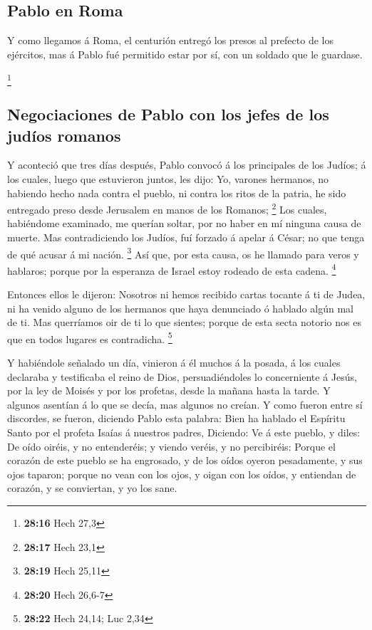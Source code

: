 \hypertarget{pablo-en-roma}{%
\subsection{Pablo en Roma}\label{pablo-en-roma}}

 Y como llegamos á Roma, el centurión entregó los presos
al prefecto de los ejércitos, mas á Pablo fué permitido estar por sí,
con un soldado que le guardase.

\footnote{\textbf{28:16} Hech 27,3}

\hypertarget{negociaciones-de-pablo-con-los-jefes-de-los-juduxedos-romanos}{%
\subsection{Negociaciones de Pablo con los jefes de los judíos
romanos}\label{negociaciones-de-pablo-con-los-jefes-de-los-juduxedos-romanos}}

 Y aconteció que tres días después, Pablo convocó á los
principales de los Judíos; á los cuales, luego que estuvieron juntos,
les dijo: Yo, varones hermanos, no habiendo hecho nada contra el pueblo,
ni contra los ritos de la patria, he sido entregado preso desde
Jerusalem en manos de los Romanos; \footnote{\textbf{28:17} Hech 23,1}
 Los cuales, habiéndome examinado, me querían soltar, por
no haber en mí ninguna causa de muerte.  Mas
contradiciendo los Judíos, fuí forzado á apelar á César; no que tenga de
qué acusar á mi nación. \footnote{\textbf{28:19} Hech 25,11}
 Así que, por esta causa, os he llamado para veros y
hablaros; porque por la esperanza de Israel estoy rodeado de esta
cadena. \footnote{\textbf{28:20} Hech 26,6-7}

 Entonces ellos le dijeron: Nosotros ni hemos recibido
cartas tocante á ti de Judea, ni ha venido alguno de los hermanos que
haya denunciado ó hablado algún mal de ti.  Mas
querríamos oir de ti lo que sientes; porque de esta secta notorio nos es
que en todos lugares es contradicha. \footnote{\textbf{28:22} Hech
  24,14; Luc 2,34}

 Y habiéndole señalado un día, vinieron á él muchos á la
posada, á los cuales declaraba y testificaba el reino de Dios,
persuadiéndoles lo concerniente á Jesús, por la ley de Moisés y por los
profetas, desde la mañana hasta la tarde.  Y algunos
asentían á lo que se decía, mas algunos no creían.  Y
como fueron entre sí discordes, se fueron, diciendo Pablo esta palabra:
Bien ha hablado el Espíritu Santo por el profeta Isaías á nuestros
padres,  Diciendo: Ve á este pueblo, y diles: De oído
oiréis, y no entenderéis; y viendo veréis, y no percibiréis:
 Porque el corazón de este pueblo se ha engrosado, y de
los oídos oyeron pesadamente, y sus ojos taparon; porque no vean con los
ojos, y oigan con los oídos, y entiendan de corazón, y se conviertan, y
yo los sane.

